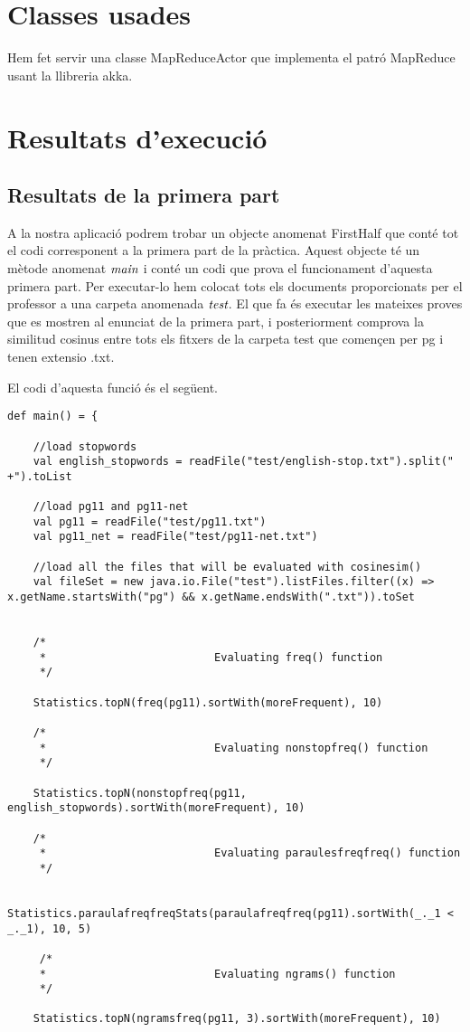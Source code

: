 \documentclass{report}
\begin{document}
\chapter{Classes usades}

Hem fet servir una classe MapReduceActor que implementa el patró MapReduce usant la llibreria akka.


\chapter{Resultats d'execució}

\section{Resultats de la primera part}

A la nostra aplicació podrem trobar un objecte anomenat FirstHalf que conté tot el codi corresponent a la primera part de la pràctica. Aquest objecte té un mètode anomenat $\emph{main}$ i conté un codi que prova el funcionament d'aquesta primera part. Per executar-lo hem colocat tots els documents proporcionats per el professor a una carpeta anomenada $\emph{test}$. El que fa és executar les mateixes proves que es mostren al enunciat de la primera part, i posteriorment comprova la similitud cosinus entre tots els fitxers de la carpeta test que començen per pg i tenen extensio .txt.

\newpage

El codi d'aquesta funció és el següent.

\begin{lstlisting}[style=scalaHighlight]
def main() = {

    //load stopwords
    val english_stopwords = readFile("test/english-stop.txt").split(" +").toList

    //load pg11 and pg11-net
    val pg11 = readFile("test/pg11.txt")
    val pg11_net = readFile("test/pg11-net.txt")

    //load all the files that will be evaluated with cosinesim()
    val fileSet = new java.io.File("test").listFiles.filter((x) => x.getName.startsWith("pg") && x.getName.endsWith(".txt")).toSet


    /*
     * 							Evaluating freq() function
     */

    Statistics.topN(freq(pg11).sortWith(moreFrequent), 10)

    /*
     * 							Evaluating nonstopfreq() function
     */

    Statistics.topN(nonstopfreq(pg11, english_stopwords).sortWith(moreFrequent), 10)

    /*
     * 							Evaluating paraulesfreqfreq() function
     */

    Statistics.paraulafreqfreqStats(paraulafreqfreq(pg11).sortWith(_._1 < _._1), 10, 5)

     /*
     * 							Evaluating ngrams() function
     */

    Statistics.topN(ngramsfreq(pg11, 3).sortWith(moreFrequent), 10)
\end{lstlisting}
\end{document}
